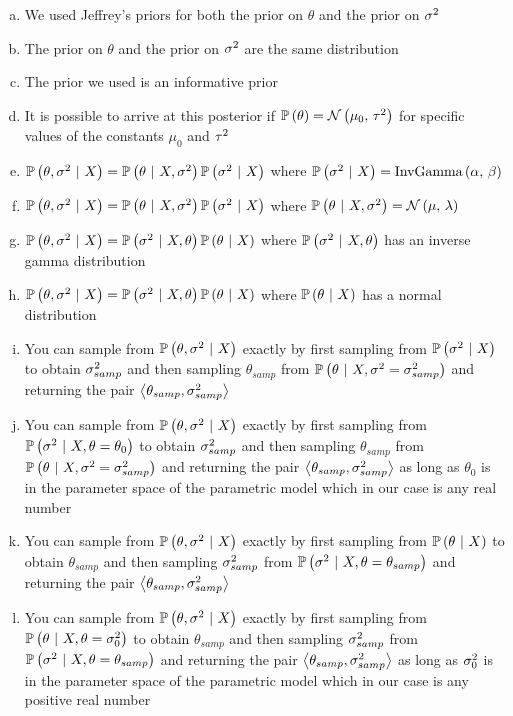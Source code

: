 \documentclass[12pt,landscape]{article}
\begin{document}
\begin{enumerate}[(a)]
\item We used Jeffrey's priors for both the prior on $\theta$ and the prior on $\sigma^2$
\item The prior on $\theta$ and the prior on $\sigma^2$ are the same distribution
\item The prior we used is an informative prior
\item It is possible to arrive at this posterior if $\mathbb{P}\left(\theta\right) = \mathcal{N}\left(\mu_0,\,\tau^2\right)$ for specific values of the constants $\mu_0$ and $\tau^2$
\item $\mathbb{P}\left(\theta, \sigma^2~|~X\right) = \mathbb{P}\left(\theta~|~X,\sigma^2\right)\mathbb{P}\left(\sigma^2~|~X\right)$ where $\mathbb{P}\left(\sigma^2~|~X\right) = \text{InvGamma}\left(\alpha,\,\beta\right)$
\item $\mathbb{P}\left(\theta, \sigma^2~|~X\right) = \mathbb{P}\left(\theta~|~X,\sigma^2\right)\mathbb{P}\left(\sigma^2~|~X\right)$ where $\mathbb{P}\left(\theta~|~X,\sigma^2\right)= \mathcal{N}\left(\mu,\,\lambda\right)$
\item $\mathbb{P}\left(\theta, \sigma^2~|~X\right) = \mathbb{P}\left(\sigma^2~|~X, \theta\right)\mathbb{P}\left(\theta~|~X\right)$ where $\mathbb{P}\left(\sigma^2~|~X, \theta\right)$ has an inverse gamma distribution
\item $\mathbb{P}\left(\theta, \sigma^2~|~X\right) = \mathbb{P}\left(\sigma^2~|~X, \theta\right)\mathbb{P}\left(\theta~|~X\right)$ where $\mathbb{P}\left(\theta~|~X\right)$ has a normal distribution

\item You can sample from $\mathbb{P}\left(\theta, \sigma^2~|~X\right)$ exactly by first sampling from $\mathbb{P}\left(\sigma^2~|~X\right)$ to obtain $\sigma^2_{samp}$ and then sampling $\theta_{samp}$ from $\mathbb{P}\left(\theta~|~X,\sigma^2 = \sigma^2_{samp}\right)$ and returning the pair $\left<\theta_{samp}, \sigma^2_{samp}\right>$
\item You can sample from $\mathbb{P}\left(\theta, \sigma^2~|~X\right)$ exactly by first sampling from $\mathbb{P}\left(\sigma^2~|~X, \theta = \theta_0\right)$ to obtain $\sigma^2_{samp}$ and then sampling $\theta_{samp}$ from $\mathbb{P}\left(\theta~|~X,\sigma^2 = \sigma^2_{samp}\right)$ and returning the pair $\left<\theta_{samp}, \sigma^2_{samp}\right>$ as long as $\theta_0$ is in the parameter space of the parametric model which in our case is any real number

\item You can sample from $\mathbb{P}\left(\theta, \sigma^2~|~X\right)$ exactly by first sampling from $\mathbb{P}\left(\theta~|~X\right)$ to obtain $\theta_{samp}$ and then sampling $\sigma^2_{samp}$ from $\mathbb{P}\left(\sigma^2~|~X,\theta = \theta_{samp}\right)$ and returning the pair $\left<\theta_{samp}, \sigma^2_{samp}\right>$
\item You can sample from $\mathbb{P}\left(\theta, \sigma^2~|~X\right)$ exactly by first sampling from $\mathbb{P}\left(\theta~|~X, \theta = \sigma^2_0\right)$ to obtain $\theta_{samp}$ and then sampling $\sigma^2_{samp}$ from $\mathbb{P}\left(\sigma^2~|~X,\theta = \theta_{samp}\right)$ and returning the pair $\left<\theta_{samp}, \sigma^2_{samp}\right>$ as long as $\sigma^2_0$ is in the parameter space of the parametric model which in our case is any positive real number


\end{enumerate}
\end{document}
